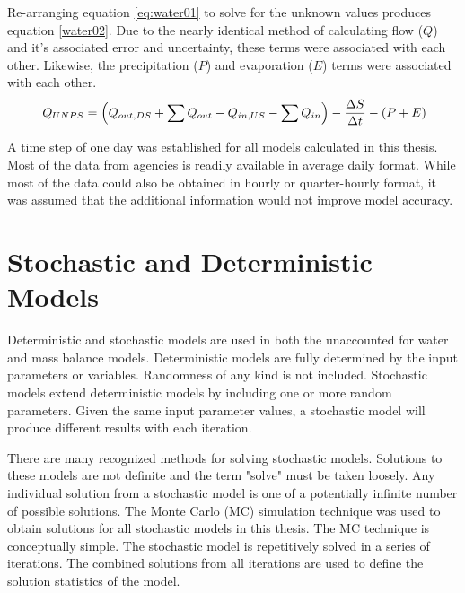 \begin{linenumbers}
Re-arranging equation \eqref{eq:water01} to solve for the unknown values produces equation \ref{water02}.  Due to the nearly identical method of calculating flow ($ Q $) and it's associated error and uncertainty, these terms were associated with each other.  Likewise, the precipitation ($ P $) and evaporation ($ E $) terms were associated with each other.
\begin{equation}\
Q_{UNPS} = \left( Q_{out,DS} + \sum Q_{out} - Q_{in,US} - \sum Q_{in} \right) - \frac{\Delta S}{\Delta t} - \left( P + E \right)\\ \label{water02}
\end{equation}

A time step of one day was established for all models calculated in this thesis.  Most of the data from agencies is readily available in average daily format.  While most of the data could also be obtained in hourly or quarter-hourly format, it was assumed that the additional information would not improve model accuracy.

\clearpage{}
\section{Stochastic and Deterministic Models}
\label{sec:StochAndDetermModels}

Deterministic and stochastic models are used in both the unaccounted for water and mass balance models.  Deterministic models are fully determined by the input parameters or variables.  Randomness of any kind is not included.  Stochastic models extend deterministic models by including one or more random parameters.  Given the same input parameter values, a stochastic model will produce different results with each iteration.

There are many recognized methods for solving stochastic models.  Solutions to these models are not definite and the term "solve" must be taken loosely.  Any individual solution from a stochastic model is one of a potentially infinite number of possible solutions.  The Monte Carlo (MC) simulation technique was used to obtain solutions for all stochastic models in this thesis.  The MC technique is conceptually simple.  The stochastic model is repetitively solved in a series of iterations.  The combined solutions from all iterations are used to define the solution statistics of the model.  


\end{linenumbers}
